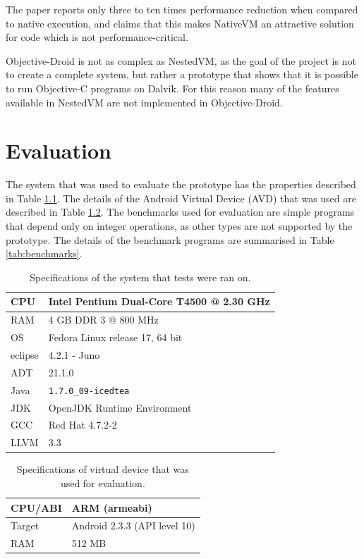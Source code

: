 \documentclass[parskip]{cs4rep}
\begin{document}
The paper reports only three to ten times performance reduction when compared to native execution, and claims that this makes NativeVM an attractive solution for code which is not performance-critical.

Objective-Droid is not as complex as NestedVM, as the goal of the project is not to create a complete system, but rather a prototype that shows that it is possible to run Objective-C programs on Dalvik. For this reason many of the features available in NestedVM are not implemented in Objective-Droid.

\chapter{Evaluation}

The system that was used to evaluate the prototype has the properties described in Table \ref{tab:testingSystem}. The details of the Android Virtual Device (AVD) that was used are described in Table \ref{tab:virtualDevice}. The benchmarks used for evaluation are simple programs that depend only on integer operations, as other types are not supported by the prototype. The details of the benchmark programs are summarised in Table \ref{tab:benchmarks}.

\begin{table}
    \centering
    \begin{tabular}{ | l | p{8cm} |}
    \hline
    CPU & Intel Pentium Dual-Core T4500 @ 2.30 GHz \\ \hline
    RAM & 4 GB DDR 3 @ 800 MHz \\ \hline
    OS & Fedora Linux release 17, 64 bit \\ \hline\hline
    eclipse & 4.2.1 - Juno \\ \hline
    ADT & 21.1.0 \\ \hline
    Java & \verb|1.7.0_09-icedtea| \\ \hline
    JDK & OpenJDK Runtime Environment \\ \hline
    GCC & Red Hat 4.7.2-2 \\ \hline
    LLVM & 3.3 \\ \hline
    \end{tabular}
    \caption{Specifications of the system that tests were ran on.}
    \label{tab:testingSystem}
\end{table}

\begin{table}
    \centering
    \begin{tabular}{ | l | p{5cm} |}
    \hline
    CPU/ABI & ARM (armeabi) \\ \hline
    Target & Android 2.3.3 (API level 10) \\ \hline
    RAM & 512 MB \\ \hline
    \end{tabular}
    \caption{Specifications of virtual device that was used for evaluation.}
    \label{tab:virtualDevice}
\end{table}
\end{document}
